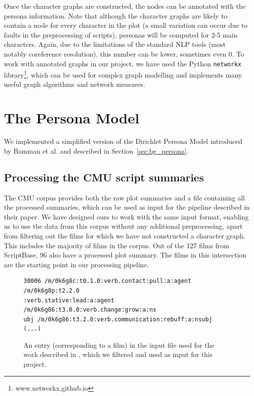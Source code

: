 \documentclass[bsc,frontabs,deptreport,singlespacing,parskip, twoside]{infthesis}
\begin{document}
Once the character graphs are constructed, the nodes can be annotated with the persona information. Note that although the character graphs are likely to contain a node for every character in the plot (a small variation can occur due to faults in the preprocessing of scripts), personas will be computed for 2-5 main characters. Again, due to the limitations of the standard NLP tools (most notably coreference resolution), this number can be lower, sometimes even 0. To work with annotated graphs in our project, we have used the Python \texttt{networkx} library\footnote{www.networkx.github.io}, which can be used for complex graph modelling and implements many useful graph algorithms and network measures.


\section{The Persona Model}
\label{sec:persona_impl}
We implemented a simplified version of the Dirichlet Persona Model introduced by Bamman et al. \cite{Bamman2013} and described in Section~\ref{sec:bg_persona}. 

\subsection{Processing the CMU script summaries}
\label{sec:processing_cmu}
The CMU corpus provides both the raw plot summaries and a file containing all the processed summaries, which can be used as input for the pipeline described in their paper. We have designed ours to work with the same input format, enabling us to use the data from this corpus without any additional preprocessing, apart from filtering out the films for which we have not constructed a character graph. This includes the majority of films in the corpus. Out of the 127 films from ScriptBase, 96 also have a processed plot summary. The films in this intersection are the starting point in our processing pipeline.

\begin{figure}[h]
\centering
\begin{minipage}{14.5cm}
\begin{Verbatim}[frame=single]
30006 /m/0k6g8c:t0.1.0:verb.contact:pull:a:agent /m/0k6g8p:t2.2.0
:verb.stative:lead:a:agent /m/0k6g86:t3.0.0:verb.change:grow:a:ns
ubj /m/0k6g86:t3.2.0:verb.communication:rebuff:a:nsubj (...)
\end{Verbatim}
\end{minipage}
\caption{An entry (corresponding to a film) in the input file used for the work described in \cite{Bamman2013}, which we filtered and used as input for this project.}
\label{fig:bamman_input}
\end{figure}
\end{document}
